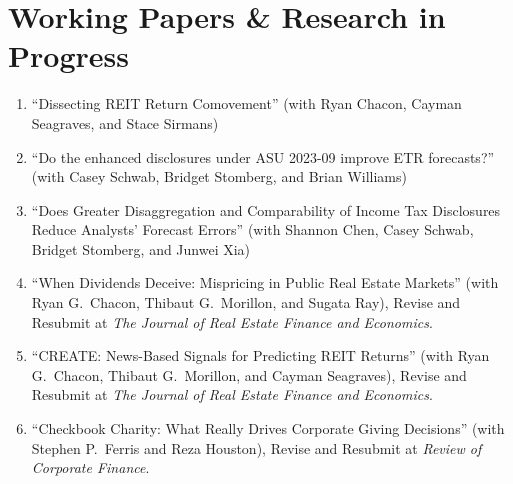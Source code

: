 \documentclass[letterpaper,11pt]{article}
\newcommand{\sectionspacing}{\vspace{-2mm}}
\begin{document}
\section{\textbf{Working Papers \& Research in Progress}}
\vspace{1mm}

\small{
\begin{enumerate}[leftmargin=*, labelsep=0.5em, itemsep=2pt]

\item ``Dissecting REIT Return Comovement'' (with Ryan Chacon, Cayman Seagraves, and Stace Sirmans)

\item ``Do the enhanced disclosures under ASU 2023-09 improve ETR forecasts?'' (with Casey Schwab, Bridget Stomberg, and Brian Williams)

\item ``Does Greater Disaggregation and Comparability of Income Tax Disclosures Reduce Analysts' Forecast Errors'' (with Shannon Chen, Casey Schwab, Bridget Stomberg, and Junwei Xia)

\item ``When Dividends Deceive: Mispricing in Public Real Estate Markets'' (with Ryan G.\ Chacon, Thibaut G.\ Morillon, and Sugata Ray), Revise and Resubmit at \textit{The Journal of Real Estate Finance and Economics}.

\item ``CREATE: News-Based Signals for Predicting REIT Returns'' (with Ryan G.\ Chacon, Thibaut G.\ Morillon, and Cayman Seagraves), Revise and Resubmit at \textit{The Journal of Real Estate Finance and Economics}.

\item ``Checkbook Charity: What Really Drives Corporate Giving Decisions'' (with Stephen P.\ Ferris and Reza Houston), Revise and Resubmit at \textit{Review of Corporate Finance}.

\end{enumerate}
}
\sectionspacing
\end{document}
